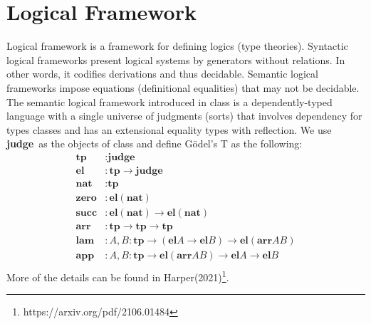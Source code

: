 \documentclass[11pt]{article}
\newcommand*{\judge}[0]{\textbf{judge}}
\begin{document}
\section*{Logical Framework}
Logical framework is a framework for defining logics (type theories). 
Syntactic logical frameworks present logical systems by generators without relations. In other words, it codifies derivations and thus decidable.
Semantic logical frameworks impose equations (definitional equalities) that may not be decidable.
The semantic logical framework introduced in class is a dependently-typed language with a single universe of judgments (sorts) that involves dependency for types classes and has an extensional equality types with reflection.
We use \judge\ as the objects of class and define G\"{o}del's T as the following:
\begin{align*}
    \textbf{tp} &: \judge \\
    \textbf{el} &: \textbf{tp} \to \judge \\
    \textbf{nat} &: \textbf{tp} \\
    \textbf{zero} &: \textbf{el} (\textbf{nat}) \\
    \textbf{succ} &: \textbf{el} (\textbf{nat}) \to \textbf{el} (\textbf{nat}) \\
    \textbf{arr} &: \textbf{tp} \to \textbf{tp} \to \textbf{tp} \\
    \textbf{lam} &: A, B : \textbf{tp} \to (\textbf{el} A \to \textbf{el} B) \to \textbf{el} (\textbf{arr} A B) \\
    \textbf{app} &: A, B : \textbf{tp} \to \textbf{el} (\textbf{arr} A B) \to \textbf{el} A \to \textbf{el} B \\
\end{align*}
More of the details can be found in Harper(2021)\footnote{https://arxiv.org/pdf/2106.01484}.
\end{document}
